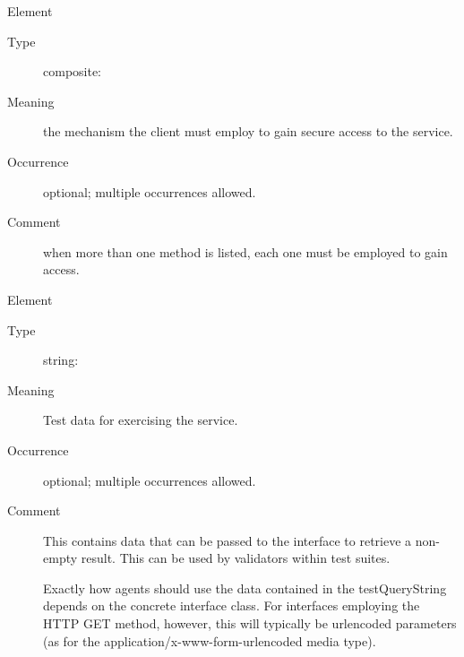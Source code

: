 \documentclass[11pt,a4paper]{ivoa}
\begin{document}
\begin{generated}
\begin{bigdescription}
\begin{description}
\end{description}
\item[Element \xmlel{securityMethod}]
\begin{description}
\item[Type] composite: 
\item[Meaning] 
                  the mechanism the client must employ to gain secure
                  access to the service.  
               
\item[Occurrence] optional; multiple occurrences allowed.
\item[Comment] 
                  when more than one method is listed, each one must
                  be employed to gain access.  
               

\end{description}
\item[Element \xmlel{testQueryString}]
\begin{description}
\item[Type] string: 
\item[Meaning] 
                  Test data for exercising the service.
               
\item[Occurrence] optional; multiple occurrences allowed.
\item[Comment] 
                  This contains data that can be passed to the interface to
                  retrieve a non-empty result.  This can be used by validators
                  within test suites.

                  Exactly how agents should use the data contained in
                  the testQueryString depends on the concrete interface class.
                  For interfaces employing the HTTP GET method, however,
                  this will typically be urlencoded parameters (as for
                  the application/x-www-form-urlencoded media type).
               

\end{description}


\end{bigdescription}\endgroup

\endgroup
\end{generated}

\end{document}
